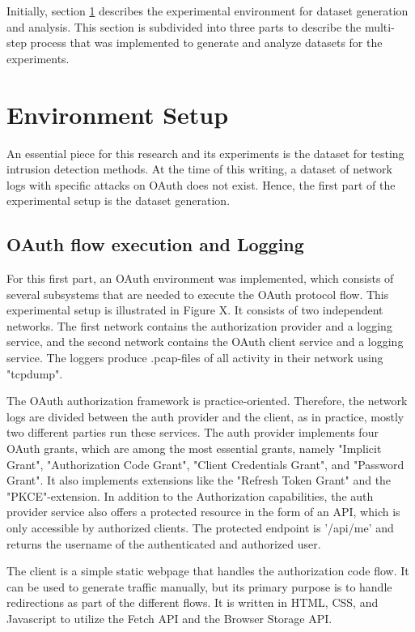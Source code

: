 \documentclass[
    fontsize=12pt,
    headings=small,
    parskip=half,           %
    bibliography=totoc,
    numbers=noenddot,       %
    open=any,               %
    ]{scrreprt}
\begin{document}
Initially, section \ref{sec:exp_setup} describes the experimental environment for dataset generation and analysis. This section is subdivided into three parts to describe the multi-step process that was implemented to generate and analyze datasets for the experiments.

\section{Environment Setup}
\label{sec:exp_setup}
An essential piece for this research and its experiments is the dataset for testing intrusion detection methods. At the time of this writing, a dataset of network logs with specific attacks on OAuth does not exist. Hence, the first part of the experimental setup is the dataset generation. 

\subsection{OAuth flow execution and Logging}
For this first part, an OAuth environment was implemented, which consists of several subsystems that are needed to execute the OAuth protocol flow. This experimental setup is illustrated in Figure X.  It consists of two independent networks. The first network contains the authorization provider and a logging service, and the second network contains the OAuth client service and a logging service. The loggers produce .pcap-files of all activity in their network using "tcpdump". 

The OAuth authorization framework is practice-oriented. Therefore, the network logs are divided between the auth provider and the client, as in practice, mostly two different parties run these services. The auth provider implements four OAuth grants, which are among the most essential grants, namely "Implicit Grant", "Authorization Code Grant", "Client Credentials Grant", and "Password Grant". It also implements extensions like the "Refresh Token Grant" and the "PKCE"-extension. In addition to the Authorization capabilities, the auth provider service also offers a protected resource in the form of an API, which is only accessible by authorized clients. The protected endpoint is '/api/me' and returns the username of the authenticated and authorized user.

The client is a simple static webpage that handles the authorization code flow. It can be used to generate traffic manually, but its primary purpose is to handle redirections as part of the different flows. It is written in HTML, CSS, and Javascript to utilize the Fetch API and the Browser Storage API.
\end{document}
